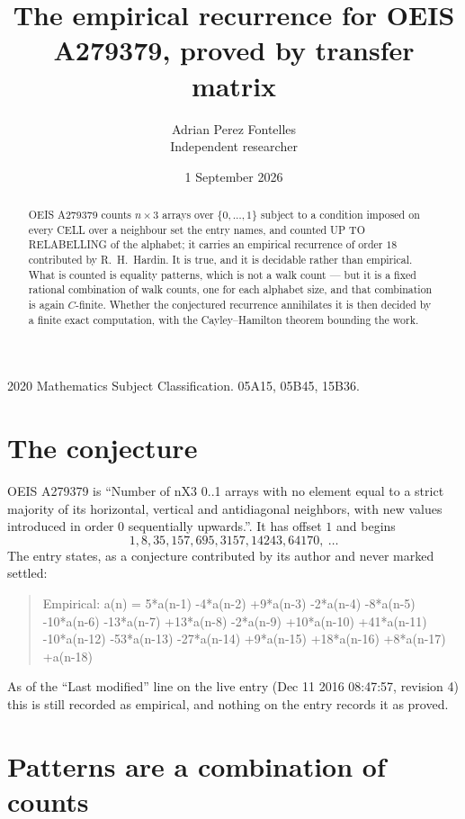 \documentclass[11pt,a4paper]{article}
\title{The empirical recurrence for OEIS A279379, proved by transfer matrix}
\author{Adrian Perez Fontelles\\ \small Independent researcher}
\date{1 September 2026}
\theoremstyle{plain}
\theoremstyle{definition}
\begin{document}
\maketitle

\begin{abstract}
OEIS A279379 counts $n\times3$ arrays over $\{0,\dots,1\}$ subject to a condition imposed on
every CELL over a neighbour set the entry names, and counted UP TO RELABELLING of the
alphabet; it carries an empirical recurrence of order $18$ contributed by
R.~H.~Hardin. It is true, and it is decidable rather than empirical. What is counted is
equality patterns, which is not a walk count --- but it is a fixed rational combination of
walk counts, one for each alphabet size, and that combination is again $C$-finite. Whether the
conjectured recurrence annihilates it is then decided by a finite exact computation, with the
Cayley--Hamilton theorem bounding the work.
\end{abstract}

\noindent\small 2020 Mathematics Subject Classification. 05A15, 05B45, 15B36.\normalsize

\section{The conjecture}

OEIS A279379 is ``Number of nX3 0..1 arrays with no element equal to a strict majority of its horizontal, vertical and antidiagonal neighbors, with new values introduced in order 0 sequentially upwards.''. It has offset $1$ and begins
\[
1, 8, 35, 157, 695, 3157, 14243, 64170,\ \dots
\]
The entry states, as a conjecture contributed by its author and never marked settled:
\begin{quote}
Empirical: a(n) = 5*a(n-1) -4*a(n-2) +9*a(n-3) -2*a(n-4) -8*a(n-5) -10*a(n-6) -13*a(n-7) +13*a(n-8) -2*a(n-9) +10*a(n-10) +41*a(n-11) -10*a(n-12) -53*a(n-13) -27*a(n-14) +9*a(n-15) +18*a(n-16) +8*a(n-17) +a(n-18)
\end{quote}
As of the ``Last modified'' line on the live entry (Dec 11 2016 08:47:57, revision 4) this is still
recorded as empirical, and nothing on the entry records it as proved.

\section{Patterns are a combination of counts}
\end{document}
